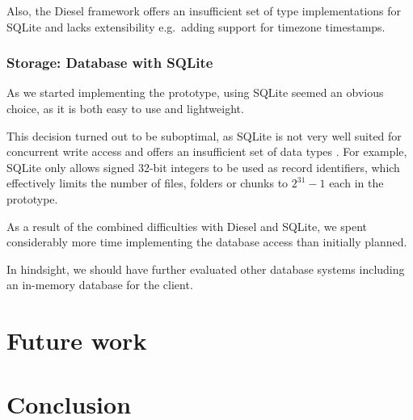 Also, the Diesel framework offers an insufficient set of type implementations for SQLite and lacks extensibility e.g.~adding support for timezone timestamps.

\subsubsection{Storage: Database with SQLite}
As we started implementing the prototype, using SQLite seemed an obvious choice, as it is both easy to use and lightweight.

This decision turned out to be suboptimal, as SQLite is not very well suited for concurrent write access \cite{sqlite-locking} and offers an insufficient set of data types \cite{sqlite-datatypes}. For example, SQLite only allows signed 32-bit integers to be used as record identifiers, which effectively limits the number of \glspl{file}, folders or \glspl{chunk} to $2^{31}-1$ each in the prototype.

As a result of the combined difficulties with Diesel and SQLite, we spent considerably more time implementing the database access than initially planned.

In hindsight, we should have further evaluated other database systems including an in-memory database for the \gls{client}.

\section{Future work}




\section{Conclusion}

